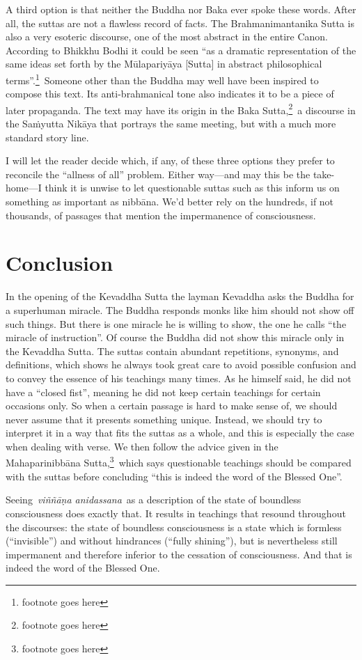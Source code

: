 \documentclass[10pt, openany]{book}
\begin{document}
A third option is that neither the Buddha nor Baka ever spoke these words. After all, the suttas are not a flawless record of facts. The Brahmanimantanika Sutta is also a very esoteric discourse, one of the most abstract in the entire Canon. According to Bhikkhu Bodhi it could be seen “as a dramatic representation of the same ideas set forth by the Mūlapariyāya [Sutta] in abstract philosophical terms”.\footnote{footnote goes here} Someone other than the Buddha may well have been inspired to compose this text. Its anti-brahmanical tone also indicates it to be a piece of later propaganda. The text may have its origin in the Baka Sutta,\footnote{footnote goes here} a discourse in the Saṁyutta Nikāya that portrays the same meeting, but with a much more standard story line.


I will let the reader decide which, if any, of these three options they prefer to reconcile the “allness of all” problem. Either way—and may this be the take-home—I think it is unwise to let questionable suttas such as this inform us on something as important as nibbāna. We’d better rely on the hundreds, if not thousands, of passages that mention the impermanence of consciousness.


\chapter{Conclusion}
In the opening of the Kevaddha Sutta the layman Kevaddha asks the Buddha for a superhuman miracle. The Buddha responds monks like him should not show off such things. But there is one miracle he is willing to show, the one he calls “the miracle of instruction”. Of course the Buddha did not show this miracle only in the Kevaddha Sutta. The suttas contain abundant repetitions, synonyms, and definitions, which shows he always took great care to avoid possible confusion and to convey the essence of his teachings many times. As he himself said, he did not have a “closed fist”, meaning he did not keep certain teachings for certain occasions only. So when a certain passage is hard to make sense of, we should never assume that it presents something unique. Instead, we should try to interpret it in a way that fits the suttas as a whole, and this is especially the case when dealing with verse. We then follow the advice given in the Mahaparinibbāna Sutta,\footnote{footnote goes here} which says questionable teachings should be compared with the suttas before concluding “this is indeed the word of the Blessed One”.


Seeing \textit{viññāṇa anidassana} as a description of the state of boundless consciousness does exactly that. It results in teachings that resound throughout the discourses: the state of boundless consciousness is a state which is formless (“invisible”) and without hindrances (“fully shining”), but is nevertheless still impermanent and therefore inferior to the cessation of consciousness. And that is indeed the word of the Blessed One.
\end{document}
